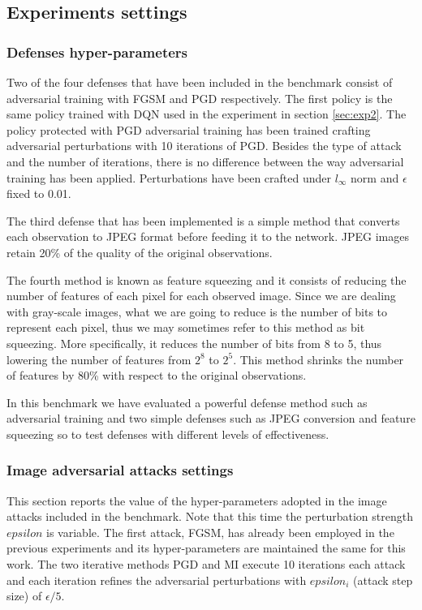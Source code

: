 \subsection{Experiments settings}
\subsubsection{Defenses hyper-parameters}
Two of the four defenses that have been included in the benchmark consist of adversarial training with FGSM and PGD respectively. The first policy is the same policy trained with DQN used in the experiment in section \ref{sec:exp2}. The policy protected with PGD adversarial training has been trained crafting adversarial perturbations with 10 iterations of PGD. Besides the type of attack and the number of iterations, there is no difference between the way adversarial training has been applied. Perturbations have been crafted under \(l_\infty\) norm and \(\epsilon\) fixed to 0.01. 

The third defense that has been implemented is a simple method that converts each observation to JPEG format before feeding it to the network. JPEG images retain 20\% of the quality of the original observations. 

The fourth method is known as feature squeezing and it consists of reducing the number of features of each pixel for each observed image. Since we are dealing with gray-scale images, what we are going to reduce is the number of bits to represent each pixel, thus we may sometimes refer to this method as bit squeezing. More specifically, it reduces the number of bits from 8 to 5, thus lowering the number of features from \(2^8\) to \(2^5\). This method shrinks the number of features by 80\% with respect to the original observations.

In this benchmark we have evaluated a powerful defense method such as adversarial training and two simple defenses such as JPEG conversion and feature squeezing so to test defenses with different levels of effectiveness.

\subsubsection{Image adversarial attacks settings}
This section reports the value of the hyper-parameters adopted in the image attacks included in the benchmark. Note that this time the perturbation strength \(epsilon\) is variable. The first attack, FGSM, has already been employed in the previous experiments and its hyper-parameters are maintained the same for this work. The two iterative methods PGD and MI execute 10 iterations each attack and each iteration refines the adversarial perturbations with \(epsilon_i\) (attack step size) of \(\epsilon/5\). 

